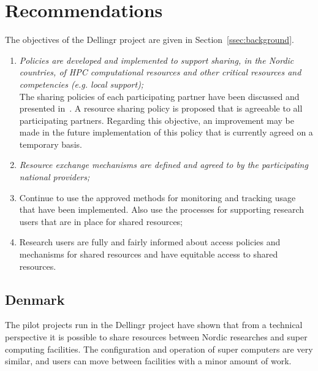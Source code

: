 \documentclass{article}
\newcommand{\dell}{Dellingr\xspace}
\begin{document}
\section{Recommendations}

The objectives of the \dell project are given in Section~\ref{ssec:background}.

\begin{enumerate}
\item {\it Policies are developed and implemented to support sharing, in the Nordic countries, of HPC computational resources and other critical resources and competencies (e.g. local support);}\\
{
The sharing policies of each participating partner have been discussed and presented in~\cite{dellingr-p2-do5}.
A resource sharing policy is proposed that is agreeable to all participating partners.
Regarding this objective, an improvement may be made in the future implementation of this policy that is currently agreed on a temporary basis.
}

\item {\it Resource exchange mechanisms are defined and agreed to by the participating national providers;}
\item Continue to use the approved methods for monitoring and tracking usage that have been implemented. Also use the processes for supporting research users that are in place for shared resources;
\item Research users are fully and fairly informed about access policies and mechanisms for shared resources and have equitable 
access to shared resources.
\end{enumerate}

\subsection{Denmark}

The pilot projects run in the \dell project have shown that from a technical perspective it is possible to share resources between Nordic researches and super computing facilities. 
The configuration and operation of super computers are very similar, and users can move between facilities with a minor amount of work.
\end{document}
